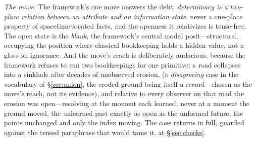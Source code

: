 \documentclass[11pt]{article}
\theoremstyle{definition}
\begin{document}
\textit{The move.} The framework's one move answers the debt: \emph{determinacy is a two-place relation between an attribute and an information state}, never a one-place property of spacetime-located facts, and the openness it relativizes is tense-free. The open state is the \emph{blank}, the framework's central modal posit---structural, occupying the position where classical bookkeeping holds a hidden value, not a gloss on ignorance. And the move's reach is deliberately audacious, because the framework refuses to run two bookkeepings for one primitive: a road collapses into a sinkhole after decades of unobserved erosion,
(a \emph{disagreeing} case in the vocabulary of \S\ref{sec:union}, the eroded ground being itself a record---chosen as the move's reach, not its evidence),
and relative to every observer on that road the erosion was open---resolving at the moment each learned, never at a moment the ground moved, the unlearned past exactly as open as the unformed future, the points unchanged and only the index moving. The case returns in full, guarded against the tensed paraphrase that would tame it, at \S\ref{sec:checks}.
\end{document}
